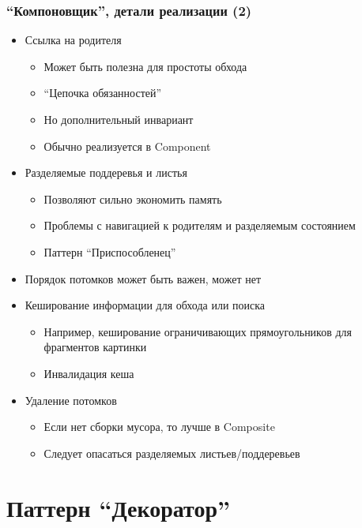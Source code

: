 \documentclass{../cscslides}
\begin{document}
    \begin{frame}
        \frametitle{``Компоновщик'', детали реализации (2)}
        \begin{itemize}
            \item Ссылка на родителя
            \begin{itemize}
                \item Может быть полезна для простоты обхода
                \item ``Цепочка обязанностей''
                \item Но дополнительный инвариант
                \item Обычно реализуется в Component
            \end{itemize}
            \item Разделяемые поддеревья и листья
            \begin{itemize}
                \item Позволяют сильно экономить память
                \item Проблемы с навигацией к родителям и разделяемым состоянием
                \item Паттерн ``Приспособленец''
            \end{itemize}
            \item Порядок потомков может быть важен, может нет
            \item Кеширование информации для обхода или поиска
            \begin{itemize}
                \item Например, кеширование ограничивающих прямоугольников для фрагментов картинки
                \item Инвалидация кеша
            \end{itemize}
            \item Удаление потомков
            \begin{itemize}
                \item Если нет сборки мусора, то лучше в Composite
                \item Следует опасаться разделяемых листьев/поддеревьев
            \end{itemize}
        \end{itemize}
    \end{frame}

    \section{Паттерн ``Декоратор''}
\end{document}
